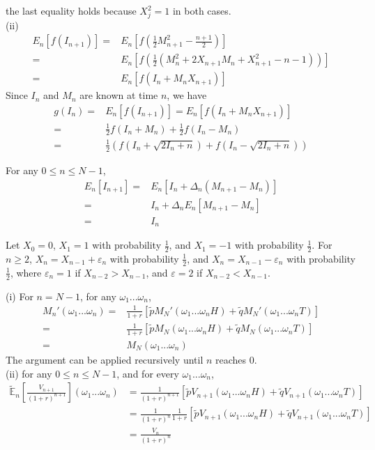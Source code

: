 \documentclass[12pt]{article}
\newenvironment{exercise}[2][Exercise]{\begin{trivlist}
		\item[\hskip \labelsep {\bfseries #1}\hskip \labelsep {\bfseries #2.}]}{\end{trivlist}}
\begin{document}
	the last equality holds because $X_j^2 = 1$ in both cases. \\
	(ii) 
	\begin{align*}
	E_n[f(I_{n+1})] =& E_n\left[f\left(\frac{1}{2}M_{n+1}^2-\frac{n+1}{2}\right)\right]\\
	=&E_n\left[f\left(\frac{1}{2}(M_n^2+2X_{n+1}M_n+X_{n+1}^2-n-1)\right)\right]\\
	=&E_n\left[f(I_n+M_nX_{n+1})\right]
	\end{align*}
	Since $I_n$ and $M_n$ are known at time $n$, we have
	\begin{align*}g(I_n) = &E_n[f(I_{n+1})] = E_n[f(I_n+M_nX_{n+1})]\\=&\frac{1}{2}f(I_n+M_n)+\frac{1}{2}f(I_n-M_n)\\=&\frac{1}{2}\left(f(I_n+\sqrt{2I_n+n})+f(I_n-\sqrt{2I_n+n})\right)\end{align*}
	\begin{exercise}{6}\end{exercise}
	For any $0\le n\le N-1$, 
	\begin{align*}
	E_n[I_{n+1}]=&E_n[I_n+\Delta_n(M_{n+1}-M_n)]\\
		=&I_n+\Delta_n E_n[M_{n+1}-M_n]\\
		=&I_n
	\end{align*}
	\begin{exercise}{7}\end{exercise}
	Let $X_0=0$, $X_1=1$ with probability $\frac{1}{2}$, and $X_1=-1$ with probability $\frac{1}{2}$. For $n\ge2$, $X_n = X_{n-1}+\varepsilon_n$ with probability $\frac{1}{2}$, and $X_n=X_{n-1}-\varepsilon_n$ with probability $\frac{1}{2}$, where $\varepsilon_n = 1$ if $X_{n-2}>X_{n-1}$, and $\varepsilon=2$ if $X_{n-2}<X_{n-1}$. 
	\begin{exercise}{8}\end{exercise}
	(i) For $n=N-1$, for any $\omega_1...\omega_n$, 
	\begin{align*}M_n'(\omega_1...\omega_n) =& \frac{1}{1+r}[\tilde{p}M_N'(\omega_1...\omega_nH)+\tilde{q}M_N'(\omega_1...\omega_nT)]\\
	=&\frac{1}{1+r}[\tilde{p}M_N(\omega_1...\omega_nH)+\tilde{q}M_N(\omega_1...\omega_nT)]\\
	=&M_N(\omega_1...\omega_n)\end{align*}
	The argument can be applied recursively until $n$ reaches $0$. \\
	(ii) for any $0\le n\le N-1$, and for every $\omega_1...\omega_n$, 
	\begin{align*}
	\tilde{\mathbb{E}}_n\left[\frac{V_{n+1}}{(1+r)^{n+1}}\right](\omega_1...\omega_n) &= \frac{1}{(1+r)^{n+1}}[\tilde{p}V_{n+1}(\omega_1...\omega_nH)+\tilde{q}V_{n+1}(\omega_1...\omega_nT)]\\
	&=\frac{1}{(1+r)^n}\frac{1}{1+r}[\tilde{p}V_{n+1}(\omega_1...\omega_nH)+\tilde{q}V_{n+1}(\omega_1...\omega_nT)]\\
	&=\frac{V_n}{(1+r)^n}
	\end{align*}
\end{document}
